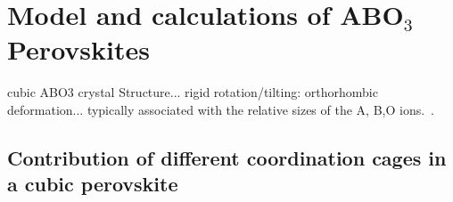 \documentclass[a4paper,prb,twocolumn]{revtex4-1}  %
\newcommand{\com}[1]{}
\newcommand{\az}[1]{{\color{magenta}{#1}}} %
\begin{document}
 





\com{
\begin{align}
E_{xy} =&
\frac{32}{7} \left[
\left(1-\frac{1}{(\delta +1)^3}\right) D_2
-
\left(1-\frac{1}{(\delta +1)^5}\right) \frac{20}{9}D_4
\right]\frac{q_o}{a},\\
E_{yz} =& E_{zx} = -3/2 E_{xy},
\end{align}
as measured from their average 
$E_0^{t_{2g}} = -64q_oD_4 \left(2+(\delta +1)^{-5}\right)/9a$.
Similarly, $e_g$ splits up as
\begin{align}
E_{x^2-y^2}=&\frac{32}{7} \left[\left(1-\frac{1}{(\delta +1)^3}\right) \text{D2}+\frac{5}{3}\left(1-\frac{1}{(\delta +1)^5}\right) \text{D4}\right]\frac{q_o}{a},\\
E_{z^2}=&-E_{x^2-y^2},
\end{align}
measured from their average 
$E_0^{e_{g}} = 32 q_oD_4 \left(2+(\delta +1)^{-5}\right)/3a$.
The crystal field splitting becomes
\begin{align}
\Delta \equiv E_0^{e_{g}}-E_0^{t_{2g}}=\frac{160}{9} \left(\frac{1}{(\delta +1)^5}+2\right) D_4.
\end{align}
}




\az{just a brief description... cooperative JT and orbital order}


\section{Model and calculations of ABO$_3$ Perovskites}%
\label{sec:calc}

cubic ABO3 crystal Structure... 
rigid rotation/tilting: orthorhombic deformation... 
typically associated with the relative sizes of the A, B,O ions.~\cite{goodenoughPRL05}.


\subsection{Contribution of different coordination cages in a cubic perovskite}
\label{sec:relativeVoctABO}
\end{document}
